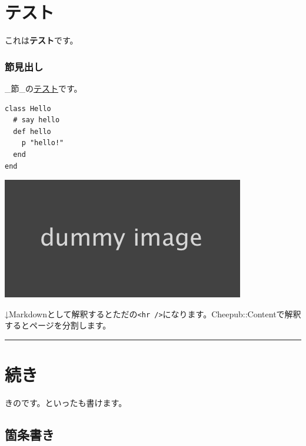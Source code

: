\chapter*{テスト}\hypertarget{テスト}{}\label{テスト}

これは\textbf{テスト}です。

\subsection*{節見出し}\hypertarget{節見出し}{}\label{節見出し}

\_節\_の\href{https://example.jp/}{テスト}です。

\begin{verbatim}class Hello
  # say hello
  def hello
    p "hello!"
  end
end
\end{verbatim}

\includegraphics[angle=0]{img/dummy.png}

↓Markdownとして解釈するとただの\texttt{\textless{}hr /\textgreater{}}になります。Cheepub::Contentで解釈するとページを分割します。

\begin{center}
\rule{3in}{0.4pt}
\end{center}

\chapter*{続き}\hypertarget{続き}{}\label{続き}

きのです。といったも書けます。

\section*{箇条書き}\hypertarget{箇条書き}{}\label{箇条書き}

